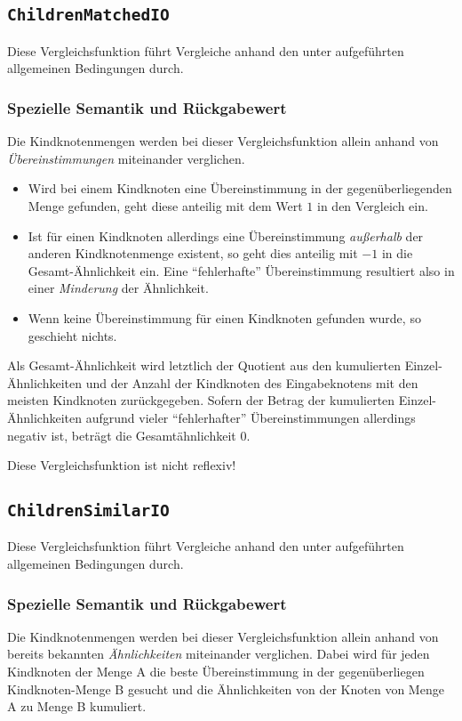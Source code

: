 %
%
\subsection{\texttt{ChildrenMatchedIO}}
Diese Vergleichsfunktion führt Vergleiche anhand den unter  aufgeführten allgemeinen Bedingungen durch.

\subsubsection*{Spezielle Semantik und Rückgabewert}
Die Kindknotenmengen werden bei dieser Vergleichsfunktion allein anhand von \emph{Übereinstimmungen} miteinander verglichen.
\begin{itemize}
	\item Wird bei einem Kindknoten eine Übereinstimmung in der gegenüberliegenden Menge gefunden, geht diese anteilig mit dem Wert $1$ in den Vergleich ein.
	\item Ist für einen Kindknoten allerdings eine Übereinstimmung \emph{außerhalb} der anderen Kindknotenmenge existent, so geht dies anteilig mit $-1$ in die Gesamt-Ähnlichkeit ein. Eine "`fehlerhafte"' Übereinstimmung resultiert also in einer \emph{Minderung} der Ähnlichkeit.
	\item Wenn keine Übereinstimmung für einen Kindknoten gefunden wurde, so geschieht nichts.
\end{itemize}

Als Gesamt-Ähnlichkeit wird letztlich der Quotient aus den kumulierten Einzel-Ähnlichkeiten und der Anzahl der Kindknoten des Eingabeknotens mit den meisten Kindknoten zurückgegeben. Sofern der Betrag der kumulierten Einzel-Ähnlichkeiten aufgrund vieler "`fehlerhafter"' Übereinstimmungen allerdings negativ ist, beträgt die Gesamtähnlichkeit $0$.

 Diese Vergleichsfunktion ist nicht reflexiv!

\newpage
%
%
\subsection{\texttt{ChildrenSimilarIO}}
Diese Vergleichsfunktion führt Vergleiche anhand den unter  aufgeführten allgemeinen Bedingungen durch.

\subsubsection*{Spezielle Semantik und Rückgabewert}
Die Kindknotenmengen werden bei dieser Vergleichsfunktion allein anhand von bereits bekannten \emph{Ähnlichkeiten} miteinander verglichen. Dabei wird für jeden Kindknoten der Menge A die beste Übereinstimmung in der gegenüberliegen Kindknoten-Menge B gesucht und die Ähnlichkeiten von der Knoten von Menge A zu Menge B kumuliert.

